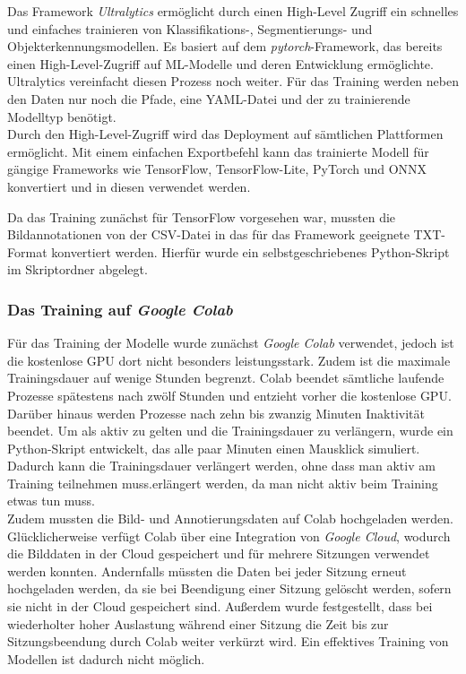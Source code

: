 Das Framework \textit{Ultralytics} ermöglicht durch einen High-Level Zugriff ein schnelles und einfaches trainieren von Klassifikations-, Segmentierungs- und Objekterkennungsmodellen. Es basiert auf dem \textit{pytorch}-Framework, das bereits einen High-Level-Zugriff auf \ac{ML}-Modelle und deren Entwicklung ermöglichte. Ultralytics vereinfacht diesen Prozess noch weiter. Für das Training werden neben den Daten nur noch die Pfade, eine YAML-Datei und der zu trainierende Modelltyp benötigt.
\\
Durch den High-Level-Zugriff wird das Deployment auf sämtlichen Plattformen ermöglicht. Mit einem einfachen Exportbefehl kann das trainierte Modell für gängige Frameworks wie TensorFlow, TensorFlow-Lite, PyTorch und ONNX konvertiert und in diesen verwendet werden.
\cite{ultralytics}

Da das Training zunächst für TensorFlow vorgesehen war, mussten die Bildannotationen von der CSV-Datei in das für das Framework geeignete TXT-Format konvertiert werden. Hierfür wurde ein selbstgeschriebenes Python-Skript im Skriptordner abgelegt.

\subsubsection{Das Training auf \textit{Google Colab}}

Für das Training der Modelle wurde zunächst \textit{Google Colab} verwendet, jedoch ist die kostenlose \ac{GPU} dort nicht besonders leistungsstark. Zudem ist die maximale Trainingsdauer auf wenige Stunden begrenzt. Colab beendet sämtliche laufende Prozesse spätestens nach zwölf Stunden und entzieht vorher die kostenlose \ac{GPU}. Darüber hinaus werden Prozesse nach zehn bis zwanzig Minuten Inaktivität beendet. Um als aktiv zu gelten und die Trainingsdauer zu verlängern, wurde ein Python-Skript entwickelt, das alle paar Minuten einen Mausklick simuliert. Dadurch kann die Trainingsdauer verlängert werden, ohne dass man aktiv am Training teilnehmen muss.erlängert werden, da man nicht aktiv beim Training etwas tun muss.
\\
Zudem mussten die Bild- und Annotierungsdaten auf Colab hochgeladen werden. Glücklicherweise verfügt Colab über eine Integration von \textit{Google Cloud}, wodurch die Bilddaten in der Cloud gespeichert und für mehrere Sitzungen verwendet werden konnten. Andernfalls müssten die Daten bei jeder Sitzung erneut hochgeladen werden, da sie bei Beendigung einer Sitzung gelöscht werden, sofern sie nicht in der Cloud gespeichert sind. Außerdem wurde festgestellt, dass bei wiederholter hoher Auslastung während einer Sitzung die Zeit bis zur Sitzungsbeendung durch Colab weiter verkürzt wird. Ein effektives Training von Modellen ist dadurch nicht möglich.


